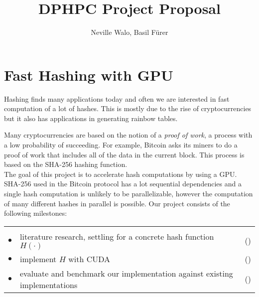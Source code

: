 \documentclass[a4paper]{article}
\author{Neville Walo, Basil F\"urer}
\title {DPHPC Project Proposal}
\newenvironment{reqlist}{%
  \par \medskip \noindent
  \begin{tabular}{cp{0.83\textwidth}r} \\[-24pt]}{\end{tabular}}
\newcommand{\req}{\\ \smallskip \smallskip $\bullet$\hspace{-0.2cm} & }
\newcounter{num}
\newcommand\effort[1]{\mbox{(\forloop{num}{0}{\value{num} < #1}{$\star$})}}
\begin{document}
\parindent 0pt
\maketitle

\section*{Fast Hashing with GPU}

Hashing finds many applications today and often we are interested in fast
computation of a lot of hashes. This is mostly due to the rise of
cryptocurrencies but it also has applications in generating rainbow tables.

Many cryptocurrencies are based on the notion of a \textit{proof of work}, a
process with a low probability of succeeding. For example, Bitcoin asks its
miners to do a proof of work that includes all of the data in the current block.
This process is based on the SHA-256 hashing function.~\cite{nakamoto2012bitcoin}
\\

The goal of this project is to accelerate hash computations by using a GPU.
SHA-256 \cite{Dang13} used in the Bitcoin protocol has a lot sequential
dependencies and a single hash computation is unlikely to be parallelizable,
however the computation of many different hashes in parallel is possible. Our
project consists of the following milestones:

\begin{reqlist}
  \req literature research, settling for a concrete hash function $H(\cdot)$
    & \effort{1}
  \req implement $H$ with CUDA~\cite{cuda}
    & \effort{3}
  \req evaluate and benchmark our implementation against existing
       implementations~\cite{bench}
    & \effort{2}
\end{reqlist}

\hfill



\end{document}
